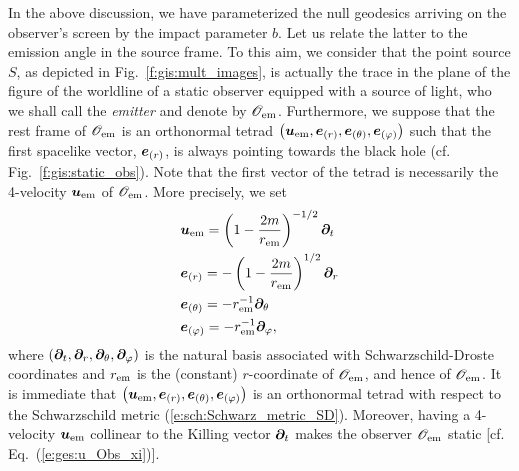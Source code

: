 In the above discussion, we have parameterized the null geodesics arriving
on the observer's screen by the impact parameter $b$. Let us relate the latter
to the emission angle in the source frame. To this aim, we consider that
the point source $S$, as depicted in Fig.~\ref{f:gis:mult_images}, is actually
the trace in the plane of the figure of the worldline of a static observer equipped
with a source of light, who we shall call the \emph{emitter} and denote
by $\mathscr{O}_{\rm em}$. Furthermore, we suppose that the rest frame of $\mathscr{O}_{\rm em}$
is an orthonormal tetrad
$\left(\bm{u}_{\rm em}, \bm{e}_{(r)}, \bm{e}_{(\theta)}, \bm{e}_{(\varphi)}\right)$ such
that the first spacelike vector, $\bm{e}_{(r)}$, is always pointing towards the
black hole (cf. Fig.~\ref{f:gis:static_obs}).
Note that the first vector of the tetrad is necessarily the
4-velocity $\bm{u}_{\rm em}$ of $\mathscr{O}_{\rm em}$. More precisely, we set
\begin{subequations}
\label{e:gis:bo_Obs_em}
\begin{align}
& \bm{u}_{\rm em} = \left( 1 - \frac{2m}{r_{\rm em}} \right)^{-1/2} \bm{\partial}_t \\
& \bm{e}_{(r)} = - \left( 1 - \frac{2m}{r_{\rm em}} \right)^{1/2} \bm{\partial}_r \\
& \bm{e}_{(\theta)} = - r_{\rm em}^{-1} \bm{\partial}_\theta \\
& \bm{e}_{(\varphi)} = - r_{\rm em}^{-1} \bm{\partial}_\varphi ,
\end{align}
\end{subequations}
where $(\bm{\partial}_t, \bm{\partial}_r, \bm{\partial}_\theta, \bm{\partial}_\varphi)$ is the natural basis associated
with Schwarzschild-Droste coordinates and $r_{\rm em}$ is the (constant) $r$-coordinate of
$\mathscr{O}_{\rm em}$, and hence of $\mathscr{O}_{\rm em}$.
It is immediate that $\left(\bm{u}_{\rm em}, \bm{e}_{(r)}, \bm{e}_{(\theta)}, \bm{e}_{(\varphi)}\right)$
is an orthonormal tetrad with respect to the Schwarzschild metric
(\ref{e:sch:Schwarz_metric_SD}). Moreover,
having a 4-velocity $\bm{u}_{\rm em}$ collinear to the Killing vector $\bm{\partial}_t$
makes the observer $\mathscr{O}_{\rm em}$ static [cf. Eq.~(\ref{e:ges:u_Obs_xi})].

